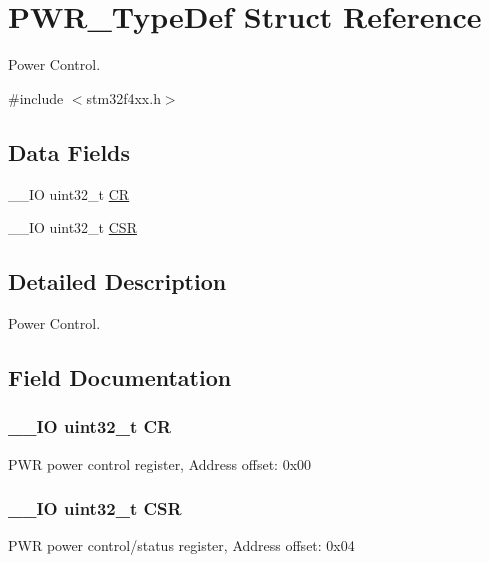 \hypertarget{struct_p_w_r___type_def}{\section{P\-W\-R\-\_\-\-Type\-Def Struct Reference}
\label{struct_p_w_r___type_def}
}


Power Control.  




{\ttfamily \#include $<$stm32f4xx.\-h$>$}

\subsection*{Data Fields}
\begin{DoxyCompactItemize}
\item 
\-\_\-\-\_\-\-I\-O uint32\-\_\-t \hyperlink{struct_p_w_r___type_def_ab40c89c59391aaa9d9a8ec011dd0907a}{C\-R}
\item 
\-\_\-\-\_\-\-I\-O uint32\-\_\-t \hyperlink{struct_p_w_r___type_def_a876dd0a8546697065f406b7543e27af2}{C\-S\-R}
\end{DoxyCompactItemize}


\subsection{Detailed Description}
Power Control. 

\subsection{Field Documentation}
\hypertarget{struct_p_w_r___type_def_ab40c89c59391aaa9d9a8ec011dd0907a}{
\subsubsection[{C\-R}]{\setlength{\rightskip}{0pt plus 5cm}\-\_\-\-\_\-\-I\-O uint32\-\_\-t C\-R}}\label{struct_p_w_r___type_def_ab40c89c59391aaa9d9a8ec011dd0907a}
P\-W\-R power control register, Address offset\-: 0x00 \hypertarget{struct_p_w_r___type_def_a876dd0a8546697065f406b7543e27af2}{
\subsubsection[{C\-S\-R}]{\setlength{\rightskip}{0pt plus 5cm}\-\_\-\-\_\-\-I\-O uint32\-\_\-t C\-S\-R}}\label{struct_p_w_r___type_def_a876dd0a8546697065f406b7543e27af2}
P\-W\-R power control/status register, Address offset\-: 0x04 

